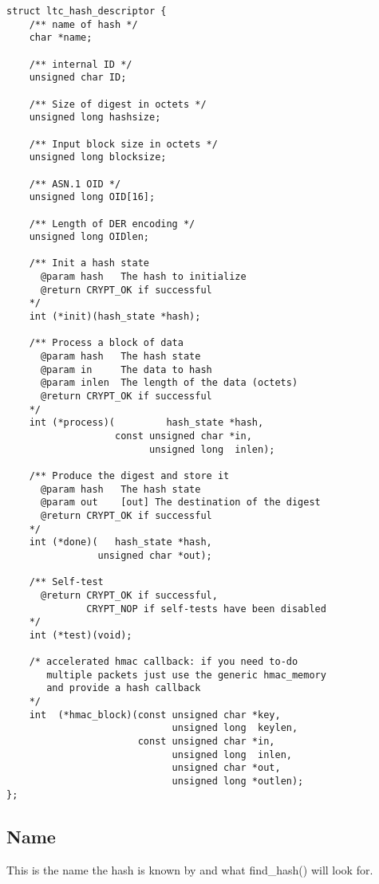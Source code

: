 \documentclass[synpaper]{book}
\begin{document}
\begin{small}
\begin{verbatim}
struct ltc_hash_descriptor {
    /** name of hash */
    char *name;

    /** internal ID */
    unsigned char ID;

    /** Size of digest in octets */
    unsigned long hashsize;

    /** Input block size in octets */
    unsigned long blocksize;

    /** ASN.1 OID */
    unsigned long OID[16];

    /** Length of DER encoding */
    unsigned long OIDlen;

    /** Init a hash state
      @param hash   The hash to initialize
      @return CRYPT_OK if successful
    */
    int (*init)(hash_state *hash);

    /** Process a block of data 
      @param hash   The hash state
      @param in     The data to hash
      @param inlen  The length of the data (octets)
      @return CRYPT_OK if successful
    */
    int (*process)(         hash_state *hash, 
                   const unsigned char *in, 
                         unsigned long  inlen);

    /** Produce the digest and store it
      @param hash   The hash state
      @param out    [out] The destination of the digest
      @return CRYPT_OK if successful
    */
    int (*done)(   hash_state *hash, 
                unsigned char *out);

    /** Self-test
      @return CRYPT_OK if successful, 
              CRYPT_NOP if self-tests have been disabled
    */
    int (*test)(void);

    /* accelerated hmac callback: if you need to-do 
       multiple packets just use the generic hmac_memory 
       and provide a hash callback 
    */
    int  (*hmac_block)(const unsigned char *key, 
                             unsigned long  keylen,
                       const unsigned char *in,  
                             unsigned long  inlen, 
                             unsigned char *out, 
                             unsigned long *outlen);
};
\end{verbatim}
\end{small}

\subsection{Name}
This is the name the hash is known by and what find\_hash() will look for.
\end{document}

